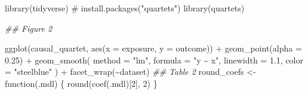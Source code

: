 \documentclass[
  letterpaper,
  DIV=11,
  numbers=noendperiod]{scrartcl}
\newenvironment{Shaded}{\begin{snugshade}}{\end{snugshade}}
\newcommand{\AttributeTok}[1]{\textcolor[rgb]{0.40,0.45,0.13}{#1}}
\newcommand{\CommentTok}[1]{\textcolor[rgb]{0.37,0.37,0.37}{#1}}
\newcommand{\ControlFlowTok}[1]{\textcolor[rgb]{0.00,0.23,0.31}{#1}}
\newcommand{\DecValTok}[1]{\textcolor[rgb]{0.68,0.00,0.00}{#1}}
\newcommand{\DocumentationTok}[1]{\textcolor[rgb]{0.37,0.37,0.37}{\textit{#1}}}
\newcommand{\FloatTok}[1]{\textcolor[rgb]{0.68,0.00,0.00}{#1}}
\newcommand{\FunctionTok}[1]{\textcolor[rgb]{0.28,0.35,0.67}{#1}}
\newcommand{\NormalTok}[1]{\textcolor[rgb]{0.00,0.23,0.31}{#1}}
\newcommand{\OtherTok}[1]{\textcolor[rgb]{0.00,0.23,0.31}{#1}}
\newcommand{\SpecialCharTok}[1]{\textcolor[rgb]{0.37,0.37,0.37}{#1}}
\newcommand{\StringTok}[1]{\textcolor[rgb]{0.13,0.47,0.30}{#1}}
\begin{document}
\begin{Shaded}
\begin{Highlighting}[]
\FunctionTok{library}\NormalTok{(tidyverse)}
\CommentTok{\# install.packages("quartets")}
\FunctionTok{library}\NormalTok{(quartets)}

\DocumentationTok{\#\# Figure 2}

\FunctionTok{ggplot}\NormalTok{(causal\_quartet, }\FunctionTok{aes}\NormalTok{(}\AttributeTok{x =}\NormalTok{ exposure, }\AttributeTok{y =}\NormalTok{ outcome)) }\SpecialCharTok{+}
  \FunctionTok{geom\_point}\NormalTok{(}\AttributeTok{alpha =} \FloatTok{0.25}\NormalTok{) }\SpecialCharTok{+} 
  \FunctionTok{geom\_smooth}\NormalTok{(}
    \AttributeTok{method =} \StringTok{"lm"}\NormalTok{, }
    \AttributeTok{formula =} \StringTok{"y \textasciitilde{} x"}\NormalTok{, }
    \AttributeTok{linewidth =} \FloatTok{1.1}\NormalTok{, }
    \AttributeTok{color =} \StringTok{"steelblue"}
\NormalTok{  ) }\SpecialCharTok{+}
  \FunctionTok{facet\_wrap}\NormalTok{(}\SpecialCharTok{\textasciitilde{}}\NormalTok{dataset)}
\DocumentationTok{\#\# Table 2}
\NormalTok{round\_coefs }\OtherTok{\textless{}{-}} \ControlFlowTok{function}\NormalTok{(.mdl) \{}
  \FunctionTok{round}\NormalTok{(}\FunctionTok{coef}\NormalTok{(.mdl)[}\DecValTok{2}\NormalTok{], }\DecValTok{2}\NormalTok{)}
\NormalTok{\}}


\end{Highlighting}
\end{Shaded}
\end{document}
